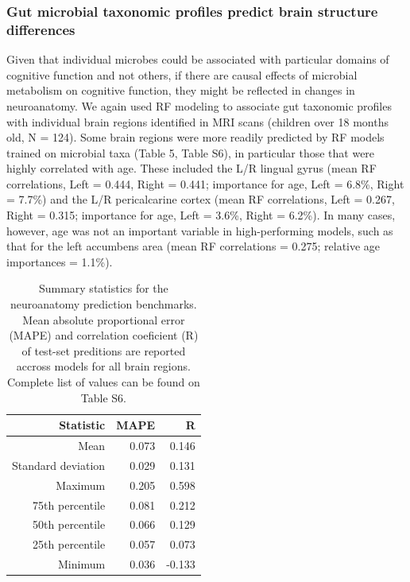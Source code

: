\documentclass{article}
\begin{document}
\subsubsection*{Gut microbial taxonomic profiles predict brain structure differences}

Given that individual microbes could be associated with particular domains
of cognitive function and not others, if there are causal effects of microbial metabolism on cognitive
function, they might be reflected in changes in neuroanatomy. We again
used RF modeling to associate gut taxonomic
profiles with individual brain regions identified in MRI scans
(children over 18 months old, N = 124).
Some brain regions were more readily
predicted by RF models trained on microbial taxa (Table 5, Table S6), in particular those that were highly correlated with age.
These included the L/R lingual gyrus (mean RF correlations, Left =
0.444, Right = 0.441; importance for age, Left = 6.8\%, Right =
7.7\%) and the L/R pericalcarine cortex (mean RF correlations, Left =
0.267, Right = 0.315; importance for age, Left = 3.6\%, Right = 6.2\%).
In many cases, however, age was not an important variable in
high-performing models, such as that for the left accumbens area (mean
RF correlations = 0.275; relative age importances = 1.1\%).

\begin{table}[!h]
    \begin{center}
    \begin{tabular}{|r|r|r|}
      \hline\hline
      \textbf{Statistic} & \textbf{MAPE} & \textbf{R} \\\hline
      Mean & 0.073 & 0.146 \\
      Standard deviation & 0.029 & 0.131 \\
      Maximum & 0.205 & 0.598 \\
      75th percentile & 0.081 & 0.212 \\
      50th percentile & 0.066 & 0.129 \\
      25th percentile & 0.057 & 0.073 \\
      Minimum & 0.036 & -0.133 \\\hline
    \end{tabular}
    \caption{\label{tab:neuro}Summary statistics for the neuroanatomy prediction benchmarks.
    Mean absolute proportional error (MAPE) and correlation coeficient (R)
    of test-set preditions are reported accross models for all brain regions.
    Complete list of values can be found on Table S6.}
    \end{center}
\end{table}
\end{document}
